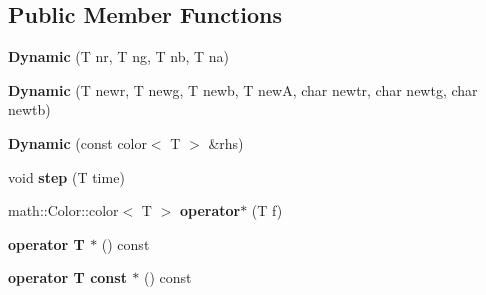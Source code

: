 \subsection*{Public Member Functions}
\begin{DoxyCompactItemize}
\item 
\hypertarget{classmath_1_1Color_1_1Dynamic_a300a309276874edf8ad8b778ea5168ce}{{\bfseries Dynamic} (T nr, T ng, T nb, T na)}\label{classmath_1_1Color_1_1Dynamic_a300a309276874edf8ad8b778ea5168ce}

\item 
\hypertarget{classmath_1_1Color_1_1Dynamic_a3c9f44dfe49459bda2dd81051058ea51}{{\bfseries Dynamic} (T newr, T newg, T newb, T new\-A, char newtr, char newtg, char newtb)}\label{classmath_1_1Color_1_1Dynamic_a3c9f44dfe49459bda2dd81051058ea51}

\item 
\hypertarget{classmath_1_1Color_1_1Dynamic_a8aa4ef281a234fde82fcd4c164e2a4ff}{{\bfseries Dynamic} (const color$<$ T $>$ \&rhs)}\label{classmath_1_1Color_1_1Dynamic_a8aa4ef281a234fde82fcd4c164e2a4ff}

\item 
\hypertarget{classmath_1_1Color_1_1Dynamic_a2ed0e1e11972d736f65f75938462fe54}{void {\bfseries step} (T time)}\label{classmath_1_1Color_1_1Dynamic_a2ed0e1e11972d736f65f75938462fe54}

\item 
\hypertarget{classmath_1_1Color_1_1Dynamic_a70cb1bd9e11ad6153c1f94bdfcef408b}{math\-::\-Color\-::color$<$ T $>$ {\bfseries operator$\ast$} (T f)}\label{classmath_1_1Color_1_1Dynamic_a70cb1bd9e11ad6153c1f94bdfcef408b}

\item 
\hypertarget{classmath_1_1Color_1_1Dynamic_aa77e0b563bc2e25866edbd751fb22a81}{{\bfseries operator T $\ast$} () const }\label{classmath_1_1Color_1_1Dynamic_aa77e0b563bc2e25866edbd751fb22a81}

\item 
\hypertarget{classmath_1_1Color_1_1Dynamic_a504c899f2f15b611b94da9b664e2d4c7}{{\bfseries operator T const $\ast$} () const }\label{classmath_1_1Color_1_1Dynamic_a504c899f2f15b611b94da9b664e2d4c7}

\end{DoxyCompactItemize}
